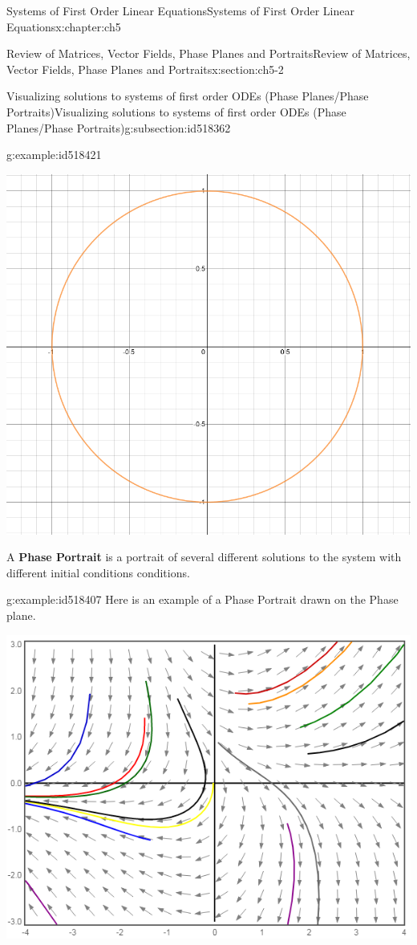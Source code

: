\documentclass[oneside,10pt,]{book}
\newcommand{\terminology}[1]{\textbf{#1}}
\numberwithin{equation}{section}
\numberwithin{equation}{section}
\begin{document}
\begin{chapterptx}{Systems of First Order Linear Equations}{}{Systems of First Order Linear Equations}{}{}{x:chapter:ch5}
\begin{sectionptx}{Review of Matrices, Vector Fields, Phase Planes and Portraits}{}{Review of Matrices, Vector Fields, Phase Planes and Portraits}{}{}{x:section:ch5-2}
\begin{subsectionptx}{Visualizing solutions to systems of first order ODEs (Phase Planes\slash{}Phase Portraits)}{}{Visualizing solutions to systems of first order ODEs (Phase Planes\slash{}Phase Portraits)}{}{}{g:subsection:id518362}
\begin{example}{}{g:example:id518421}
\begin{image}{0}{1}{0}
\includegraphics[width=\linewidth]{images/5-parametric1.png}
\end{image}%
%
\end{example}
A \terminology{Phase Portrait}  is a portrait of several different solutions to the system with different initial conditions conditions.%
\begin{example}{}{g:example:id518407}%
Here is an example of a Phase Portrait drawn on the Phase plane. \begin{image}{0}{1}{0}%
\includegraphics[width=\linewidth]{images/7.2-1.png}
\end{image}%

\end{example}
\end{subsectionptx}
\end{sectionptx}
\end{chapterptx}
\end{document}
